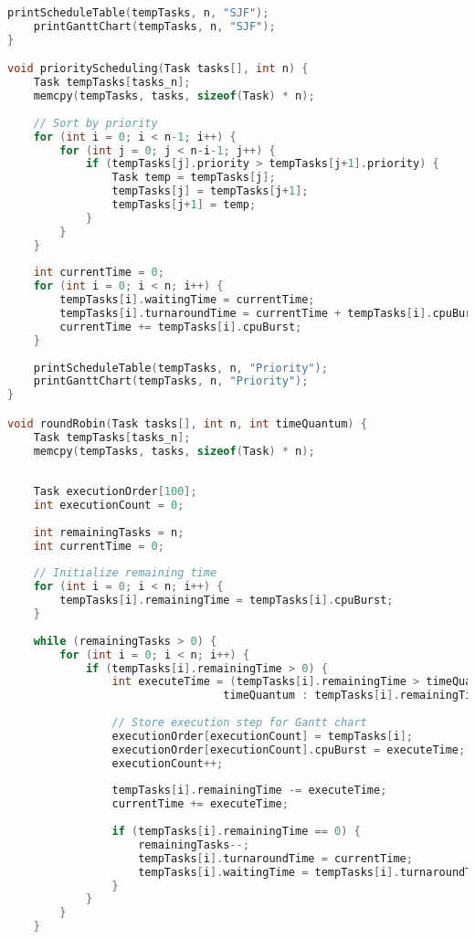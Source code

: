 \documentclass{article}
\begin{document}
\begin{lstlisting}[language=C, caption=Scheduling Code ]
    printScheduleTable(tempTasks, n, "SJF");
    printGanttChart(tempTasks, n, "SJF");
}

void priorityScheduling(Task tasks[], int n) {
    Task tempTasks[tasks_n];
    memcpy(tempTasks, tasks, sizeof(Task) * n);
    
    // Sort by priority
    for (int i = 0; i < n-1; i++) {
        for (int j = 0; j < n-i-1; j++) {
            if (tempTasks[j].priority > tempTasks[j+1].priority) {
                Task temp = tempTasks[j];
                tempTasks[j] = tempTasks[j+1];
                tempTasks[j+1] = temp;
            }
        }
    }
    
    int currentTime = 0;
    for (int i = 0; i < n; i++) {
        tempTasks[i].waitingTime = currentTime;
        tempTasks[i].turnaroundTime = currentTime + tempTasks[i].cpuBurst;
        currentTime += tempTasks[i].cpuBurst;
    }
    
    printScheduleTable(tempTasks, n, "Priority");
    printGanttChart(tempTasks, n, "Priority");
}

void roundRobin(Task tasks[], int n, int timeQuantum) {
    Task tempTasks[tasks_n];
    memcpy(tempTasks, tasks, sizeof(Task) * n);
    
   
    Task executionOrder[100];  
    int executionCount = 0;
    
    int remainingTasks = n;
    int currentTime = 0;
    
    // Initialize remaining time
    for (int i = 0; i < n; i++) {
        tempTasks[i].remainingTime = tempTasks[i].cpuBurst;
    }
    
    while (remainingTasks > 0) {
        for (int i = 0; i < n; i++) {
            if (tempTasks[i].remainingTime > 0) {
                int executeTime = (tempTasks[i].remainingTime > timeQuantum) ? 
                                 timeQuantum : tempTasks[i].remainingTime;
                
                // Store execution step for Gantt chart
                executionOrder[executionCount] = tempTasks[i];
                executionOrder[executionCount].cpuBurst = executeTime;
                executionCount++;
                
                tempTasks[i].remainingTime -= executeTime;
                currentTime += executeTime;
                
                if (tempTasks[i].remainingTime == 0) {
                    remainingTasks--;
                    tempTasks[i].turnaroundTime = currentTime;
                    tempTasks[i].waitingTime = tempTasks[i].turnaroundTime - tempTasks[i].cpuBurst;
                }
            }
        }
    }
    

\end{lstlisting}
\end{document}
